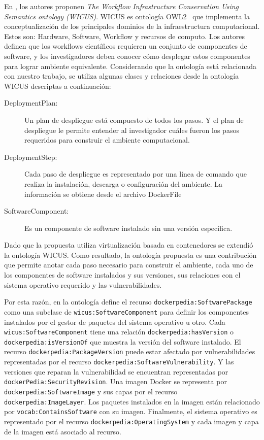 En \cite{santana2017reproducibility}, los autores proponen \emph{The Workflow Infrastructure Conservation Using Semantics ontology (WICUS)}. WICUS es ontología OWL2~\cite{motik2009owl} que implementa la conceptualización de los principales dominios de la infraestructura computacional. Estos son: Hardware, Software, Workflow y recursos de computo.
Los autores definen que los workflows científicos requieren un conjunto de componentes de software, y los investigadores deben conocer cómo desplegar estos componentes para lograr ambiente equivalente.
Considerando que la ontología está relacionada con nuestro trabajo, se utiliza algunas clases y relaciones desde la ontología WICUS descriptas a continuación:

\begin{description}
	\item [DeploymentPlan:]  Un plan de despliegue está compuesto de todos los pasos. Y el plan de despliegue le permite entender al investigador cuáles fueron los pasos requeridos para construir el ambiente computacional.
	\item [DeploymentStep:] Cada paso de despliegue es representado por una línea de comando que realiza la instalación, descarga o configuración del ambiente. La información se obtiene desde el archivo DockerFile
	\item [SoftwareComponent:] Es un componente de software instalado sin una versión específica. 
\end{description} 

Dado que la propuesta utiliza virtualización basada en contenedores se extendió la ontología WICUS. Como resultado, la ontología propuesta es una contribución que permite anotar cada paso necesario para construir el ambiente, cada uno de los componentes de software instalados y sus versiones, sus relaciones con el sistema operativo requerido y las vulnerabilidades.

Por esta razón, en la ontología define el recurso \texttt{dockerpedia:SoftwarePackage} como una subclase de \texttt{wicus:SoftwareComponent} para definir los componentes instalados por el gestor de paquetes del sistema operativo u otro.
Cada \texttt{wicus:SoftwareComponent} tiene una relación \texttt{dockerpedia:hasVersion} o \texttt{dockerpedia:isVersionOf} que muestra la versión del software instalado.
El recurso \texttt{dockerpedia:PackageVersion} puede estar afectado por vulnerabilidades representadas por el recurso \texttt{dockerpedia:\linebreak SoftwareVulnerability}. Y las versiones que reparan la vulnerabilidad se encuentran representadas por \texttt{dockerPedia:SecurityRevision}.
Una imagen Docker se representa por \texttt{dockerpedia:SoftwareImage} y sus capas por el recurso \texttt{dockerpedia:ImageLayer}. Los paquetes instalados en la imagen están relacionado por \texttt{vocab:ContainsSoftware} con su imagen.
Finalmente, el sistema operativo es representado por el recurso \texttt{dockerpedia:OperatingSystem} y cada imagen y capa de la imagen está asociado al recurso.


